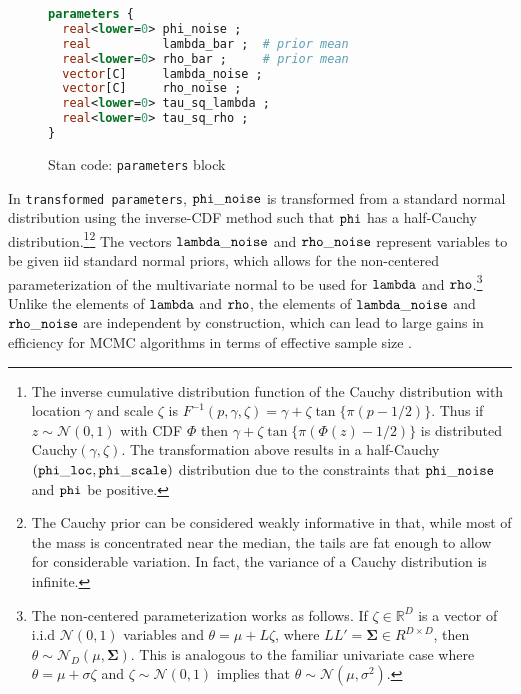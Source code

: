 \begin{figure}[h]
\begin{lstlisting}[language=Stan, frame=trBL]
parameters {
  real<lower=0> phi_noise ;    
  real          lambda_bar ;  # prior mean 
  real<lower=0> rho_bar ;     # prior mean 
  vector[C]     lambda_noise ;      
  vector[C]     rho_noise ;
  real<lower=0> tau_sq_lambda ;  
  real<lower=0> tau_sq_rho ;
}
\end{lstlisting}
\caption{Stan code: {\tt parameters} block}
\label{stan_parameters}
\end{figure}

In {\tt transformed parameters}, ${\tt phi\_noise}$ is transformed from a standard normal 
distribution using the inverse-CDF method such that ${\tt phi}$ has a half-Cauchy 
distribution.\footnote{
The inverse cumulative distribution function of the Cauchy distribution with location $\gamma$ 
and scale $\zeta$ is $F^{-1}(p, \gamma,\zeta)  = \gamma + \zeta \tan{\{ \pi (p - 1/2)\}}$. Thus if 
$z \sim \mathcal{N}(0,1)$ with CDF $\Phi$ then $\gamma + \zeta \tan{\{ \pi (\Phi(z) - 1/2)\}}$ is 
distributed Cauchy$(\gamma, \zeta)$. The transformation above results in a half-Cauchy$({\tt phi\_loc}, 
{\tt phi\_scale})$ distribution due to the constraints that ${\tt phi\_noise}$ and ${\tt phi}$ be positive.}\footnote{
The Cauchy prior can be considered weakly informative in that, while most of the mass is concentrated 
near the median, the tails are fat enough to allow for considerable variation. In fact, the variance of a 
Cauchy distribution is infinite.} The vectors ${\tt lambda\_noise}$ and ${\tt rho\_noise}$ represent variables 
to be given iid standard normal priors, which allows for the non-centered parameterization of the 
multivariate normal to be used for ${\tt lambda}$ and ${\tt rho}$.\footnote{
The non-centered parameterization works as follows. If $\zeta \in \mathbb{R}^D$ is a vector of i.i.d 
$\mathcal{N}(0,1)$ variables and $\theta = \mu + L \zeta$, where 
$LL' = \boldsymbol{\Sigma} \in R^{D \times D}$, then $\theta \sim \mathcal{N}_D (\mu, \boldsymbol{\Sigma})$.
This is analogous to the familiar univariate case where $\theta = \mu + \sigma \zeta$ and 
$\zeta \sim \mathcal{N}(0,1)$ implies that $\theta \sim \mathcal{N}(\mu, \sigma^2)$.} Unlike the elements 
of ${\tt lambda}$ and ${\tt rho}$, the elements of ${\tt lambda\_noise}$ and ${\tt rho\_noise}$ are 
independent by construction, which can lead to large gains in efficiency for MCMC algorithms in 
terms of effective sample size . 

